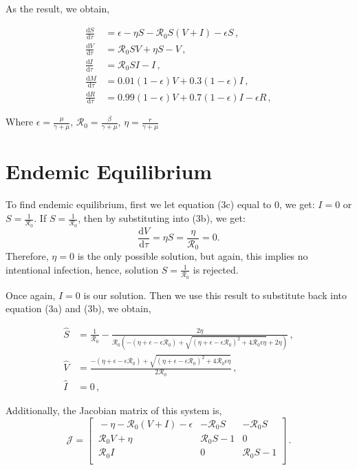 \documentclass[12pt]{article}
\newcommand\dbyd[2]{\frac{\mathrm d{#1}}{\mathrm d{#2}}}
\newcommand{\R}{\mathcal{R}}
\begin{document}
As the result, we obtain,

\begin{subequations}\label{1}
\begin{align}
\dbyd{S}{\tau}&=\epsilon-\eta S-\R_0 S(V+I)-\epsilon S\,, \\
\dbyd{V}{\tau}&=\R_0 SV+\eta S-V\,,\\
\dbyd{I}{\tau}&=\R_0 SI-I\,,\\
\dbyd{M}{\tau}&=0.01(1-\epsilon) V+0.3(1-\epsilon) I\,,\\
\dbyd{R}{\tau}&=0.99(1-\epsilon) V+0.7(1-\epsilon) I-\epsilon R\,,
\end{align}
\end{subequations}

Where $\epsilon=\frac{\mu}{\gamma+\mu}$, $\R_0=\frac{\beta}{\gamma+\mu}$, $\eta=\frac{r}{\gamma+\mu}$

\section{Endemic Equilibrium}

To find endemic equilibrium, first we let equation (3c) equal to 0, we get: $I=0$ or $S=\frac{1}{\R_0}$. If $S=\frac{1}{\R_0}$, then by substituting into (3b), we get:
\begin{equation}
\dbyd{V}{\tau}=\eta S=\frac{\eta}{\R_0} = 0.
\end{equation}
Therefore, $\eta=0$ is the only possible solution, but again, this implies no intentional infection, hence, solution $S=\frac{1}{\R_0}$ is rejected.

Once again, $I=0$ is our solution. Then we use this result to substitute back into equation (3a) and (3b), we obtain,

\begin{subequations}
\begin{align}
\hat{S} &= \frac{1}{\R_0}-\frac{2\eta}{\R_0(-(\eta+\epsilon-\epsilon\R_0)+\sqrt{(\eta+\epsilon-\epsilon\R_0)^2+4\R_0\epsilon \eta}+2\eta)}\,,\\
\hat{V} &= \frac{-(\eta+\epsilon-\epsilon\R_0)+\sqrt{(\eta+\epsilon-\epsilon\R_0)^2+4\R_0\epsilon \eta}}{2\R_0}\,,\\
\hat{I} &= 0\,,
\end{align}
\end{subequations}

Additionally, the Jacobian matrix of this system is,
\begin{equation}
\mathcal{J} =
\begin{bmatrix}
    \ -\eta-\R_0 (V+I)-\epsilon       & -\R_0 S     &-\R_0 S\\
    \ \R_0 V+\eta       & \R_0 S-1    &0\\
    \ \R_0 I       &0     &\R_0 S-1\\
\end{bmatrix}\,.
\end{equation}
\end{document}
